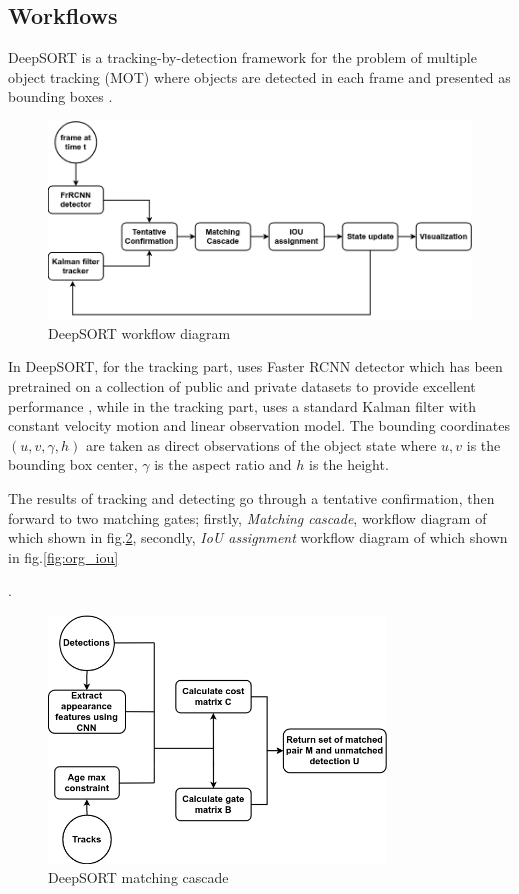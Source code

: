 \subsection{Workflows}
\hspace{0.5cm} DeepSORT is a tracking-by-detection framework for the problem of multiple object tracking (MOT) where objects are detected in each frame and presented as bounding boxes \cite{sort}.\par
\begin{figure}[h!]
    \centering
    \includegraphics[width=\textwidth]{Chapters/Fig/Thesis_diagram-DeepSORT.png}
    \caption{DeepSORT workflow diagram}
    \label{fig:deepsort_workflow}
\end{figure}
In DeepSORT, for the tracking part, \cite{Wojke2017simple} uses Faster RCNN detector which has been pretrained on a collection of public and private datasets to provide excellent performance \cite{Wojke2017simple}, while in the tracking part, \cite{Wojke2017simple} uses a standard Kalman filter with constant velocity motion and linear observation model. The bounding coordinates $(u,v,\gamma,h)$ are taken as direct observations of the object state where $u,v$ is the bounding box center, $\gamma$ is the aspect ratio and $h$ is the height.\par
The results of tracking and detecting go through a tentative confirmation, then forward to two matching gates; 
firstly, \textit{Matching cascade}, workflow diagram of which shown in fig.\ref{fig:org_matching_cascade},
 secondly, \textit{IoU assignment} workflow diagram of which shown in fig.\ref{fig:org_iou}\par.
\begin{figure}[h!]
    \centering
    \includegraphics[width=0.8\textwidth]{Chapters/Fig/Thesis_diagram-CNN_Matching_Cascade.png}
    \caption{DeepSORT matching cascade}
    \label{fig:org_matching_cascade}
\end{figure}
